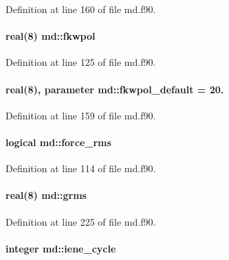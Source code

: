 Definition at line 160 of file md.\-f90.

\hypertarget{classmd_a84bcb46a25be5a1296c920b70d1ccbcb}{
\paragraph[{fkwpol}]{\setlength{\rightskip}{0pt plus 5cm}real(8) md\-::fkwpol}}\label{classmd_a84bcb46a25be5a1296c920b70d1ccbcb}


Definition at line 125 of file md.\-f90.

\hypertarget{classmd_ae9e782c19e7636346e18a19c7e4b4589}{
\paragraph[{fkwpol\-\_\-default}]{\setlength{\rightskip}{0pt plus 5cm}real(8), parameter md\-::fkwpol\-\_\-default = 20.}}\label{classmd_ae9e782c19e7636346e18a19c7e4b4589}


Definition at line 159 of file md.\-f90.

\hypertarget{classmd_ae40f56bdbbd45c9779f92082c633b1dc}{
\paragraph[{force\-\_\-rms}]{\setlength{\rightskip}{0pt plus 5cm}logical md\-::force\-\_\-rms}}\label{classmd_ae40f56bdbbd45c9779f92082c633b1dc}


Definition at line 114 of file md.\-f90.

\hypertarget{classmd_aa78ae49355795a928f821c72e943312e}{
\paragraph[{grms}]{\setlength{\rightskip}{0pt plus 5cm}real(8) md\-::grms}}\label{classmd_aa78ae49355795a928f821c72e943312e}


Definition at line 225 of file md.\-f90.

\hypertarget{classmd_a087ee8ef5f74cad007aebaeb7220ff40}{
\paragraph[{iene\-\_\-cycle}]{\setlength{\rightskip}{0pt plus 5cm}integer md\-::iene\-\_\-cycle}}\label{classmd_a087ee8ef5f74cad007aebaeb7220ff40}


